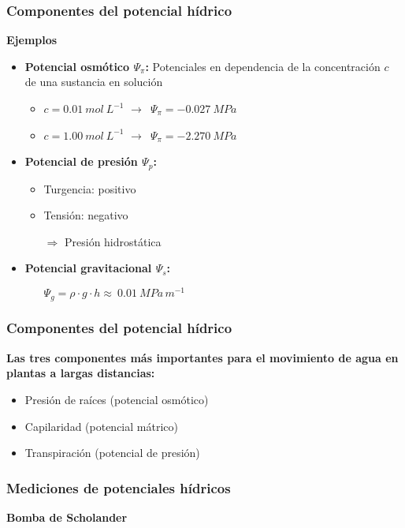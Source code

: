 \documentclass[usepdftitle=false]{beamer}
\newcommand{\Blue}[1]{{\color{blue!50!black}\textbf{#1}}}
\newcommand{\rar}{$\rightarrow$}
\newcommand{\Rar}{$\Rightarrow$}
\newcommand{\tw}{\textwidth}
\begin{document}
\begin{frame}
	\frametitle{Componentes del potencial hídrico}
	\textbf{\Large Ejemplos}
	\begin{itemize}
		\item \Blue{Potencial osmótico $\Psi_\pi$:} Potenciales en dependencia de la concentración $c$ de una sustancia en solución
		\begin{itemize}
		    \item $c = 0.01~mol~L^{-1}$ \rar\ $\Psi_\pi = -0.027~MPa$
			\item $c = 1.00~mol~L^{-1}$  \rar\ $\Psi_\pi = -2.270~MPa$			 
		\end{itemize} 
	    \item \Blue{Potencial de presión $\Psi_p$:}
	    \begin{itemize}
	    	\item Turgencia: positivo
	    	\item Tensión: negativo	 
	    	\item[\Rar] Presión hidrostática
	    \end{itemize} 
	    \item \Blue{Potencial gravitacional $\Psi_s$:} \begin{itemize}
	    	\item[] $\Psi_g = \rho \cdot g \cdot h \approx\ 0.01~MPa\,m^{-1}$ 
	    \end{itemize} 
	\end{itemize}
\end{frame}


\begin{frame}
	\frametitle{Componentes del potencial hídrico}
\textbf{Las tres componentes más importantes para el movimiento de agua en plantas a largas distancias:}
		\begin{itemize}
			\item Presión de raíces (potencial osmótico)
			\item Capilaridad (potencial mátrico)
			\item Transpiración	 (potencial de presión)		
		\end{itemize}

\end{frame}

\begin{frame}
	\frametitle{Mediciones de potenciales hídricos}
		\begin{block}{\textbf{Bomba de Scholander}}
		\end{block}
\end{frame}
\end{document}
